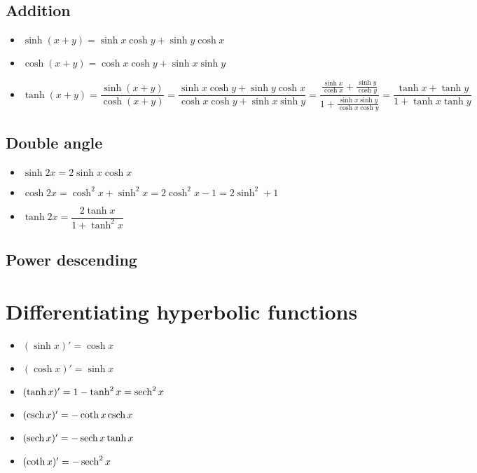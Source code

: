 \subsection{Addition}
\begin{itemize}
	\item $\sinh(x+y)=\sinh x \cosh y + \sinh y \cosh x$
	\item $\cosh(x+y)=\cosh x \cosh y + \sinh x \sinh y$
	\item $\tanh(x+y) = \dfrac{\sinh(x+y)}{\cosh(x+y)} = \dfrac{\sinh x \cosh y + \sinh y \cosh x}{\cosh x \cosh y + \sinh x \sinh y} = \dfrac{\frac{\sinh x}{\cosh x}+\frac{\sinh y}{\cosh y}}{1 + \frac{\sinh x \sinh y}{\cosh x \cosh y}}=\dfrac{\tanh x + \tanh y}{1 + \tanh x \tanh y}$
\end{itemize}

\subsection{Double angle}
\begin{itemize}
	\item $\sinh 2x = 2\sinh x \cosh x$
	\item $\cosh 2x = \cosh^2 x + \sinh^2 x = 2\cosh^2 x - 1 = 2\sinh^2 + 1$
	\item $\tanh 2x = \dfrac{2\tanh x}{1 + \tanh^2 x}$
\end{itemize}

\subsection{Power descending}


\section{Differentiating hyperbolic functions}
\begin{itemize}
	\item $(\sinh x)'=\cosh x$
	\item $(\cosh x)'=\sinh x$
	\item $(\tanh x)'=1-\tanh^2 x = \operatorname{sech}^2 x$
	\item $(\operatorname{csch} x)'=-\coth x \operatorname{csch} x$
	\item $(\operatorname{sech} x)'=-\operatorname{sech} x \tanh x$
	\item $(\coth x)'=-\operatorname{sech}^2 x$
\end{itemize}